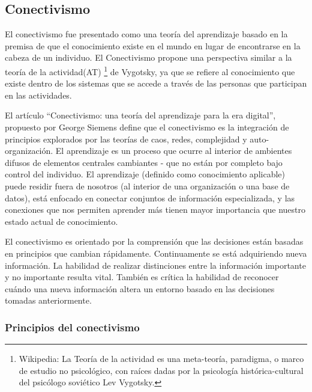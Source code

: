 \subsection{Conectivismo}

El conectivismo fue presentado como una teoría del aprendizaje basado en la
premisa de que el conocimiento existe en el mundo en lugar de encontrarse en la
cabeza de un individuo. El Conectivismo propone una perspectiva similar a la
teoría de la actividad(AT) \footnote{Wikipedia: La Teoría de la actividad es
una meta-teoría, paradigma, o marco de estudio no psicológico, con raíces dadas
por la psicología histórica-cultural del psicólogo soviético Lev Vygotsky.}
de Vygotsky, ya que se refiere al conocimiento que existe dentro de los
sistemas que se accede a través de las personas que participan en las 
actividades.

El artículo “Conectivismo: una teoría del aprendizaje para la era digital”,
propuesto por George Siemens define que el conectivismo es la integración de
principios explorados por las teorías de caos, redes, complejidad y auto-
organización. El aprendizaje es un proceso que ocurre al interior de ambientes
difusos de elementos centrales cambiantes - que no están por completo bajo
control del individuo. El aprendizaje (definido como conocimiento aplicable)
puede residir fuera de nosotros (al interior de una organización o una base de
datos), está enfocado en conectar conjuntos de información especializada, y las
conexiones que nos permiten aprender más tienen mayor importancia que nuestro
estado actual de conocimiento.

El conectivismo es orientado por la comprensión que las decisiones están
basadas en principios que cambian rápidamente. Continuamente se está
adquiriendo nueva información. La habilidad de realizar distinciones entre la
información importante y no importante resulta vital. También es crítica la
habilidad de reconocer cuándo una nueva información altera un entorno basado en
las decisiones tomadas anteriormente.

\subsubsection{Principios del conectivismo}

